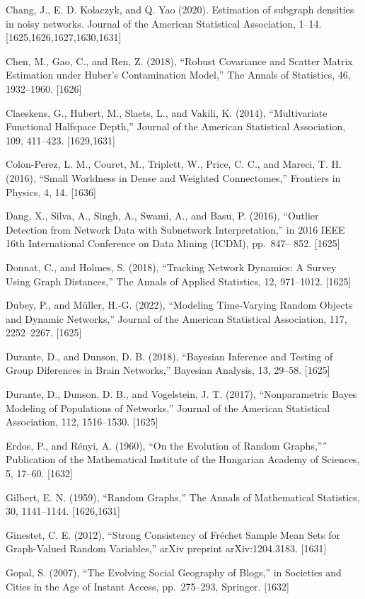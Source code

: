 \documentclass[
  10
]{article}
\begin{document}
Chang, J., E. D. Kolaczyk, and Q. Yao (2020). Estimation of subgraph
densities in noisy networks. Journal of the American Statistical
Association, 1--14. {[}1625,1626,1627,1630,1631{]}

Chen, M., Gao, C., and Ren, Z. (2018), ``Robust Covariance and Scatter
Matrix Estimation under Huber's Contamination Model,'' The Annals of
Statistics, 46, 1932--1960. {[}1626{]}

Claeskens, G., Hubert, M., Slaets, L., and Vakili, K. (2014),
``Multivariate Functional Halfspace Depth,'' Journal of the American
Statistical Association, 109, 411--423. {[}1629,1631{]}

Colon-Perez, L. M., Couret, M., Triplett, W., Price, C. C., and Mareci,
T. H. (2016), ``Small Worldness in Dense and Weighted Connectomes,''
Frontiers in Physics, 4, 14. {[}1636{]}

Dang, X., Silva, A., Singh, A., Swami, A., and Basu, P. (2016),
``Outlier Detection from Network Data with Subnetwork Interpretation,''
in 2016 IEEE 16th International Conference on Data Mining (ICDM),
pp.~847-- 852. {[}1625{]}

Donnat, C., and Holmes, S. (2018), ``Tracking Network Dynamics: A Survey
Using Graph Distances,'' The Annals of Applied Statistics, 12,
971--1012. {[}1625{]}

Dubey, P., and Müller, H.-G. (2022), ``Modeling Time-Varying Random
Objects and Dynamic Networks,'' Journal of the American Statistical
Association, 117, 2252--2267. {[}1625{]}

Durante, D., and Dunson, D. B. (2018), ``Bayesian Inference and Testing
of Group Diferences in Brain Networks,'' Bayesian Analysis, 13, 29--58.
{[}1625{]}

Durante, D., Dunson, D. B., and Vogelstein, J. T. (2017),
``Nonparametric Bayes Modeling of Populations of Networks,'' Journal of
the American Statistical Association, 112, 1516--1530. {[}1625{]}

Erdos, P., and Rényi, A. (1960), ``On the Evolution of Random Graphs,''˝
Publication of the Mathematical Institute of the Hungarian Academy of
Sciences, 5, 17--60. {[}1632{]}

Gilbert, E. N. (1959), ``Random Graphs,'' The Annals of Mathematical
Statistics, 30, 1141--1144. {[}1626,1631{]}

Ginestet, C. E. (2012), ``Strong Consistency of Fréchet Sample Mean Sets
for Graph-Valued Random Variables,'' arXiv preprint arXiv:1204.3183.
{[}1631{]}

Gopal, S. (2007), ``The Evolving Social Geography of Blogs,'' in
Societies and Cities in the Age of Instant Access, pp.~275--293,
Springer. {[}1632{]}
\end{document}
